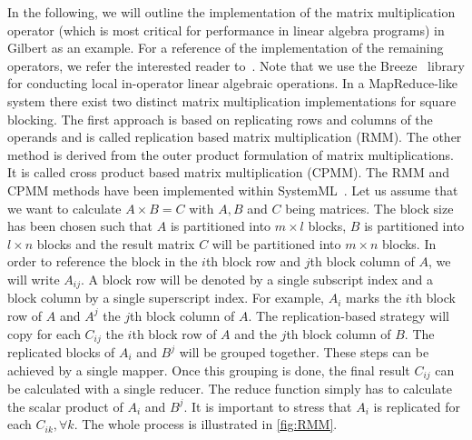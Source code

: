 In the following, we will outline the implementation of the matrix multiplication operator (which is most critical for performance in linear algebra programs) in Gilbert as an example. For a reference of the implementation of the remaining operators, we refer the interested reader to~\cite{Rohrmann2014}. Note that we use the Breeze~\cite{breeze} library for conducting local in-operator linear algebraic operations. In a MapReduce-like system there exist two distinct matrix multiplication implementations for square blocking. The first approach is based on replicating rows and columns of the operands and is called replication based matrix multiplication (RMM). The other method is derived from the outer product formulation of matrix multiplications. It is called cross product based matrix multiplication (CPMM). The RMM and CPMM methods have been implemented within SystemML~\cite{ghoting:2011a}. Let us assume that we want to calculate $A \times B = C$ with $A,B$ and $C$ being matrices. The block size has been chosen such that $A$ is partitioned into $m\times l$ blocks, $B$ is partitioned into $l \times n$ blocks and the result matrix $C$ will be partitioned into $m\times n$ blocks. In order to reference the block in the $i$th block row and $j$th block column of $A$, we will write $A_{ij}$. A block row will be denoted by a single subscript index and a block column by a single superscript index. For example, $A_i$ marks the $i$th block row of $A$ and $A^j$ the $j$th block column of $A$. The replication-based strategy will copy for each $C_{ij}$ the $i$th block row of $A$ and the $j$th block column of $B$. The replicated blocks of $A_i$ and $B^j$ will be grouped together. These steps can be achieved by a single mapper. Once this grouping is done, the final result $C_{ij}$ can be calculated with a single reducer. The reduce function simply has to calculate the scalar product of $A_i$ and $B^j$. It is important to stress that $A_i$ is replicated for each $C_{ik},\forall k$. The whole process is illustrated in \cref{fig:RMM}.

